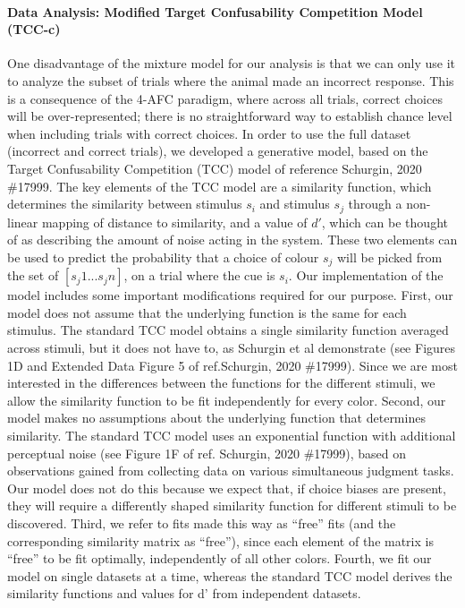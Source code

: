\paragraph{Data Analysis: Modified Target Confusability Competition Model (TCC-c)}\label{para:TCC}
One disadvantage of the mixture model for our analysis is that we can only use it to analyze the subset of trials where the animal made an incorrect response.  This is a consequence of the 4-AFC paradigm, where across all trials, correct choices will be over-represented; there is no straightforward way to establish chance level when including trials with correct choices. In order to use the full dataset (incorrect and correct trials), we developed a generative model, based on the Target Confusability Competition (TCC) model of reference {Schurgin, 2020 \#17999}. The key elements of the TCC model are a similarity function, which determines the similarity between stimulus $s_i$ and stimulus $s_j$ through a non-linear mapping of distance to similarity, and a value of $d'$, which can be thought of as describing the amount of noise acting in the system. These two elements can be used to predict the probability that a choice of colour $s_j$ will be picked from the set of $[s_j1...s_jn ]$, on a trial where the cue is $s_i$. Our implementation of the model includes some important modifications required for our purpose.
First, our model does not assume that the underlying function is the same for each stimulus. The standard TCC model obtains a single similarity function averaged across stimuli, but it does not have to, as Schurgin et al demonstrate (see Figures 1D and Extended Data Figure 5 of ref.{Schurgin, 2020 \#17999}). Since we are most interested in the differences between the functions for the different stimuli, we allow the similarity function to be fit independently for every color. Second, our model makes no assumptions about the underlying function that determines similarity. The standard TCC model uses an exponential function with additional perceptual noise (see Figure 1F of ref. {Schurgin, 2020 \#17999}), based on observations gained from collecting data on various simultaneous judgment tasks. Our model does not do this because we expect that, if choice biases are present, they will require a differently shaped similarity function for different stimuli to be discovered. Third, we refer to fits made this way as “free” fits (and the corresponding similarity matrix as “free”), since each element of the matrix is “free” to be fit optimally, independently of all other colors. Fourth, we fit our model on single datasets at a time, whereas the standard TCC model derives the similarity functions and values for d' from independent datasets.

